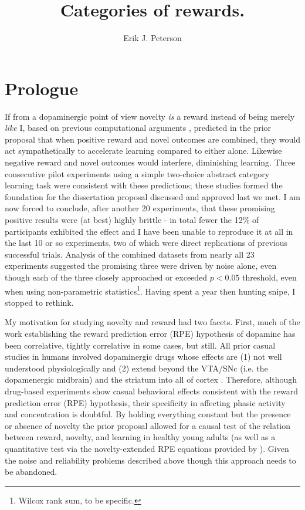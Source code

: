 \documentclass[doc,12pt]{apa}        %
\title{Categories of rewards.}
\author{Erik J. Peterson} \affiliation{Dept. of Psychology \\ Colorado State University \\ Fort Collins, CO}
\begin{document}
 
\maketitle

\section{Prologue} %
\label{sec:prologue}
If from a dopaminergic point of view novelty \emph{is} a reward instead of being merely \emph{like} I, based on previous computational arguments \cite{Kakade:2002p6414}, predicted in the prior proposal that when positive reward and novel outcomes are combined, they would act sympathetically to accelerate learning compared to either alone.  Likewise negative reward and novel outcomes would interfere, diminishing learning. Three consecutive pilot experiments using a simple two-choice abstract category learning task were consistent with these predictions; these studies formed the foundation for the dissertation proposal discussed and approved last we met.  I am now forced to conclude, after another 20 experiments, that these promising positive results were (at best) highly brittle - in total fewer the 12\% of participants exhibited the effect and I have been unable to reproduce it at all in the last 10 or so experiments, two of which were direct replications of previous successful trials.  Analysis of the combined datasets from nearly all 23 experiments suggested the promising three were driven by noise alone, even though each of the three closely approached or exceeded $p < 0.05$ threshold, even when using non-parametric statistics\footnote{Wilcox rank sum, to be specific.}.  Having spent a year then hunting snipe, I stopped to rethink. 

My motivation for studying novelty and reward had two facets.  First, much of the work establishing the reward prediction error (RPE) hypothesis of dopamine has been correlative, tightly correlative in some cases, but still.  All prior casual studies in humans involved dopaminergic drugs whose effects are (1) not well understood physiologically and (2) extend beyond the VTA/SNc (i.e. the dopamenergic midbrain) and the striatum into all of cortex \cite{Menon:2007p6529,Pizzagalli:2008p6521,Schonberg:2009p6669}.  Therefore, although drug-based experiments show casual behavioral effects consistent with the reward prediction error (RPE) hypothesis, their specificity in affecting phasic activity and concentration is doubtful.  By holding everything constant but the presence or absence of novelty the prior proposal allowed for a causal test of the relation between reward, novelty, and learning in healthy young adults (as well as a quantitative test via the novelty-extended RPE equations provided by ).  Given the noise and reliability problems described above though this approach needs to be abandoned.
\end{document}
